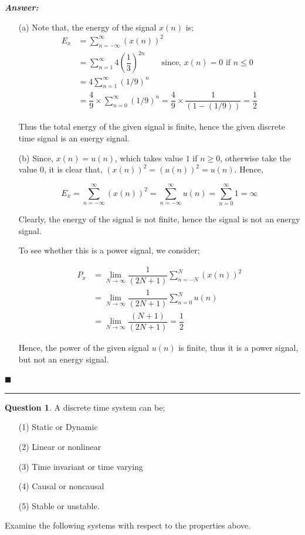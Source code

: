 \documentclass[12pt]{article}
\theoremstyle{definition}
\newtheorem{question}{Question}
\newenvironment{answer}{
    \textbf{\textit{Answer:}} \qquad
}{\hfill $\blacksquare$ \\ \begin{center}
    \rule{0.6\linewidth}{0.5px}    
\end{center}
}
\begin{document}
\begin{answer}
    \begin{enumerate}
        \item[(a)]  Note that, the energy of the signal $x(n)$ is;
        \begin{align*}
            E_x & = \sum_{n = -\infty}^{\infty} (x(n))^2\\
            & = \sum_{n = 1}^{\infty} 4 \left(\dfrac{1}{3} \right)^{2n} \qquad \text{since, } x(n) = 0 \text{ if } n \leq 0\\
            & = 4\sum_{n = 1}^{\infty} (1/9)^n\\
            & = \dfrac{4}{9} \times \sum_{n = 0}^{\infty} (1/9)^n = \dfrac{4}{9} \times \dfrac{1}{(1 - (1/9))} = \dfrac{1}{2}
        \end{align*} 

        Thus the total energy of the given signal is finite, hence the given discrete time signal is an energy signal.

        \item[(b)] Since, $x(n) = u(n)$, which takes value $1$ if $n \geq 0$, otherwise take the value $0$, it is clear that, $(x(n))^2 = (u(n))^2 = u(n)$. Hence,
        
        $$
        E_x = \sum_{n = -\infty}^{\infty} (x(n))^2 = \sum_{n = -\infty}^{\infty} u(n) = \sum_{n = 0}^{\infty} 1 = \infty
        $$

        Clearly, the energy of the signal is not finite, hence the signal is not an energy signal. 

        To see whether this is a power signal, we consider;

        \begin{align*}
            P_x & = \lim_{N \rightarrow \infty} \dfrac{1}{(2N+1)} \sum_{n = -N}^N (x(n))^2\\
            & = \lim_{N \rightarrow \infty} \dfrac{1}{(2N+1)} \sum_{n = 0}^N u(n)\\
            & = \lim_{N \rightarrow \infty} \dfrac{(N+1)}{(2N + 1)} = \dfrac{1}{2}
        \end{align*}

        Hence, the power of the given signal $u(n)$ is finite, thus it is a power signal, but not an energy signal.
    \end{enumerate}
\end{answer}


\begin{question}
    A discrete time system can be;
    \begin{enumerate}
        \item[(1)] Static or Dynamic
        \item[(2)] Linear or nonlinear
        \item[(3)] Time invariant or time varying
        \item[(4)] Causal or noncausal
        \item[(5)] Stable or unstable.   
    \end{enumerate}

    Examine the following systems with respect to the properties above.
\end{question}
\end{document}

